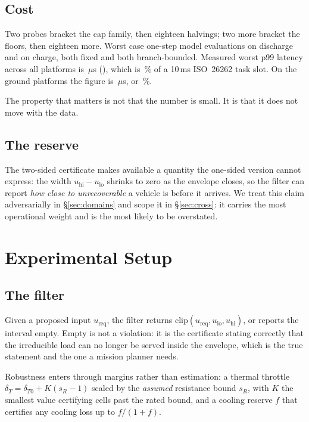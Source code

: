 \documentclass[11pt,letterpaper]{article}
\theoremstyle{definition}
\theoremstyle{remark}
\begin{document}
\subsection{Cost}

Two probes bracket the cap family, then eighteen halvings; two more bracket the floors, then
eighteen more. Worst case \evalDischarge{} one-step model evaluations on discharge and
\evalCharge{} on charge, both fixed and both branch-bounded. Measured worst p99 latency across
all \vPlatforms{} platforms is \worstLatency{}\,$\mu$s (\worstLatencyCase{}), which is
\slotFraction\,\% of a 10\,ms ISO~26262 task slot. On the ground platforms the figure is
\groundLatency{}\,$\mu$s, or \groundSlotPct\,\%.

The property that matters is not that the number is small. It is that it does not move with the
data.

\subsection{The reserve}\label{sec:reserve}

The two-sided certificate makes available a quantity the one-sided version cannot express: the
width $u_{\mathrm{hi}} - u_{\mathrm{lo}}$ shrinks to zero as the envelope closes, so the filter
can report \emph{how close to unrecoverable} a vehicle is before it arrives. We treat this claim
adversarially in \S\ref{sec:domains} and scope it in \S\ref{sec:cross}: it carries the most
operational weight and is the most likely to be overstated.

\section{Experimental Setup}\label{sec:method}

\subsection{The filter}

Given a proposed input $u_{\mathrm{req}}$, the filter returns
$\mathrm{clip}(u_{\mathrm{req}}, u_{\mathrm{lo}}, u_{\mathrm{hi}})$, or reports the interval
empty. Empty is not a violation: it is the certificate stating correctly that the irreducible
load can no longer be served inside the envelope, which is the true statement and the one a
mission planner needs.

Robustness enters through margins rather than estimation: a thermal throttle
$\delta_T = \delta_{T0} + K(s_R - 1)$ scaled by the \emph{assumed} resistance bound $s_R$, with
$K$ the smallest value certifying cells past the rated bound, and a cooling reserve $f$ that
certifies any cooling loss up to $f/(1+f)$.
\end{document}
